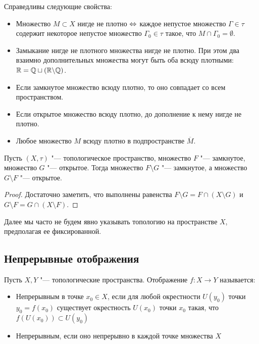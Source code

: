 \begin{note}
	Справедливы следующие свойства:
	\begin{itemize}
		\item Множество ${M \subset X}$ нигде не плотно $\Leftrightarrow$ каждое непустое множество $\Gamma \in \tau$ содержит некоторое непустое множество $\Gamma_0 \in \tau$ такое, что $M \cap \Gamma_0 = \emptyset$.
		
		\item Замыкание нигде не плотного множества нигде не плотно. При этом два взаимно дополнительных множества могут быть оба всюду плотными: $\mathbb{R} = \mathbb{Q} \sqcup (\mathbb{R}\backslash \mathbb{Q})$.
		
		\item Если замкнутое множество всюду плотно, то оно совпадает со всем пространством.
		
		\item Если открытое множество всюду плотно, до дополнение к нему нигде не плотно.
		
		\item Любое множество $M$ всюду плотно в подпространстве $\overline{M}$.
	\end{itemize}
\end{note}

\begin{proposition}
	Пусть $(X, \tau)$ "--- топологическое пространство, множество $F$ "--- замкнутое, множество $G$ "--- открытое. Тогда множество $F \setminus G$ "--- замкнутое, а множество $G \setminus F$ "--- открытое.
\end{proposition}

\begin{proof}
	Достаточно заметить, что выполнены равенства $F\setminus G = F\cap (X\setminus G)$ и $G\setminus F = G\cap(X\setminus F)$.
\end{proof}

\begin{note}
	Далее мы часто не будем явно указывать топологию на пространстве $X$, предполагая ее фиксированной.
\end{note}

\subsection{Непрерывные отображения}

\begin{definition}
	Пусть $X, Y$ "--- топологические пространства. Отображение $f : X \to Y$ называется:
	\begin{itemize}
		\item Непрерывным в точке $x_0 \in X$, если для любой окрестности $U(y_0)$ точки $y_0 = f(x_0)$ существует окрестность $U(x_0)$ точки $x_0$ такая, что $f(U(x_0)) \subset U(y_0)$
		
		\item Непрерывным, если оно непрерывно в каждой точке множества $X$
	\end{itemize} 
\end{definition}

